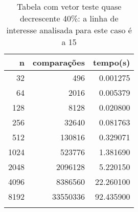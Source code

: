 \begin{table}[ht]
\centering
\begin{tabular}{rrr} \toprule
        n &    comparações &       tempo(s) \\ \midrule
      32  &            496 &      0.001275 \\
      64  &           2016 &      0.005379 \\
     128  &           8128 &      0.020800 \\
     256  &          32640 &      0.081763 \\
     512  &         130816 &      0.329071 \\
    1024  &         523776 &      1.381690 \\
    2048  &        2096128 &      5.220150 \\
    4096  &        8386560 &     22.260100 \\
    8192  &       33550336 &     92.435900 \\
\bottomrule\addlinespace
\end{tabular}
\caption{Tabela com vetor teste quase decrescente 40\%: a linha de interesse analisada para este caso é a 15}
\label{tab:bolhaQuaseDecresc40}
\end{table}

